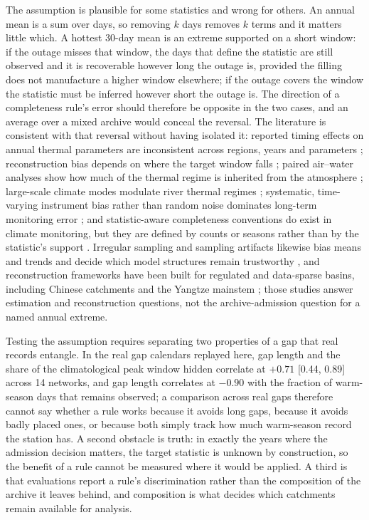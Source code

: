 \documentclass[draft]{agujournal2025}
\begin{document}
The assumption is plausible for some statistics and wrong for others. An annual
mean is a sum over days, so removing $k$ days removes $k$ terms and it matters
little which. A hottest 30-day mean is an extreme supported on a short window:
if the outage misses that window, the days that define the statistic are still
observed and it is recoverable however long the outage is, provided the filling
does not manufacture a higher window elsewhere; if the outage covers the window
the statistic must be inferred however short the outage is. The direction of a
completeness rule's error should therefore be opposite in the two cases, and an
average over a mixed archive would conceal the reversal. The literature is consistent with that
reversal without having isolated it: reported timing effects on annual thermal
parameters are inconsistent across regions, years and parameters
\cite{johnson2021}; reconstruction bias depends on where the target window falls
\cite{beaufort2022}; paired air--water analyses show how much of the thermal
regime is inherited from the atmosphere \cite{hare2023}; large-scale climate
modes modulate river thermal regimes \cite{sanikhani2026,you2026}; systematic, time-varying instrument bias rather than random
noise dominates long-term monitoring error \cite{jackson2025}; and
statistic-aware completeness conventions do exist in climate monitoring, but
they are defined by counts or seasons rather than by the statistic's support
\cite{zhang2011}. Irregular sampling and sampling artifacts likewise bias means
and trends and decide which model structures remain trustworthy
\cite{grey2024}, and reconstruction frameworks have been built for regulated and
data-sparse basins, including Chinese catchments and the Yangtze mainstem
\cite{huang2023,wang2025}; those studies answer estimation and reconstruction
questions, not the archive-admission question for a named annual extreme.

Testing the assumption requires separating two properties of a gap that real
records entangle. In the real gap calendars replayed here, gap length and the
share of the climatological peak window hidden correlate at $+0.71$
[0.44, 0.89] across 14 networks, and gap length correlates at $-0.90$ with the
fraction of warm-season days that remains observed; a comparison across real
gaps therefore cannot say whether a rule works because it avoids long gaps,
because it avoids badly placed ones, or because both simply track how much
warm-season record the station has. A
second obstacle is truth: in exactly the years where the admission decision
matters, the target statistic is unknown by construction, so the benefit of a
rule cannot be measured where it would be applied. A third is that evaluations
report a rule's discrimination rather than the composition of the archive it
leaves behind, and composition is what decides which catchments remain available
for analysis.
\end{document}
